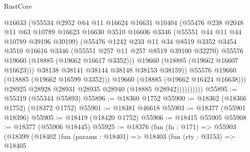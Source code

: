 \begin{lexlean}{RustCore}
\begin{coremodule}
                            @16633
                            (@55534
                              @2952
                              @64
                              @11
                              @16624
                              @16631
                              @10404
                              (@55476
                                @238
                                @2048
                                @11
                                @63
                                @10789
                                @16623
                                @16630
                                @3510
                                @16606
                                @3346
                                (@55551 @44 @11 @44 @10789 @39196 @39199)
                                (@55476
                                  @1242
                                  @233
                                  @11
                                  @34
                                  @8519
                                  @3352
                                  @3454
                                  @3510
                                  @16616
                                  @3346
                                  (@55551 @257 @11 @257 @8519 @39100 @32270)
                                  @55576
                                  @19660
                                  (@18885 (@19662 @16617 @3352)))
                                @19660
                                (@18885 (@19662 @16607 @16623)))
                              @38138
                              @38141
                              @38144
                              @38148
                              @38153
                              @38159))
                          @55576
                          @19660
                          (@18885 (@19662 @16599 @3352)))
                        @19660
                        (@18885 (@19662 @16424 @16638)))
                      @28925
                      @28928
                      @28931
                      @28935
                      @28940
                      (@18885 @28942))))))))))
@55895 := @55319 (@55344 @55893)
@55896 := @18360 @1752
@55900 := @18362 (@18366 @1752) (@18372 @1752)
@55901 := @18381 @46618
@55903 := @18377 (@55901 @18396)
@55905 := @18419 (@18420 @1752)
@55906 := @18415 @55905
@55908 := @18377 (@55906 @18445)
@55925 := @18376
    (fun (fn : @171) =>
    @55903
      (@18399
        (@18402
          (fun (params : @18401) =>
          @18403
            (fun (rty : @3153) =>
            @18405

\end{coremodule}
\end{lexlean}
